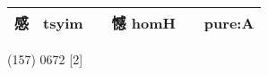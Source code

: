 \documentclass[14pt,a4paper]{scrartcl}
\begin{document}
\begin{longtable}[c]{@{}llllll@{}}
\begin{minipage}[t]{0.14\columnwidth}
感
\strut\end{minipage} &
\begin{minipage}[t]{0.14\columnwidth}\raggedright\strut
tsyim
\strut\end{minipage} &
\begin{minipage}[t]{0.14\columnwidth}\raggedright\strut
\strut\end{minipage} &
\begin{minipage}[t]{0.14\columnwidth}\raggedright\strut
憾 homH
\strut\end{minipage} &
\begin{minipage}[t]{0.14\columnwidth}\raggedright\strut
\strut\end{minipage} &
\begin{minipage}[t]{0.14\columnwidth}\raggedright\strut
pure:A
\strut\end{minipage}\tabularnewline
\bottomrule
\end{longtable}

(157) 0672 {[}2{]}
\end{document}
